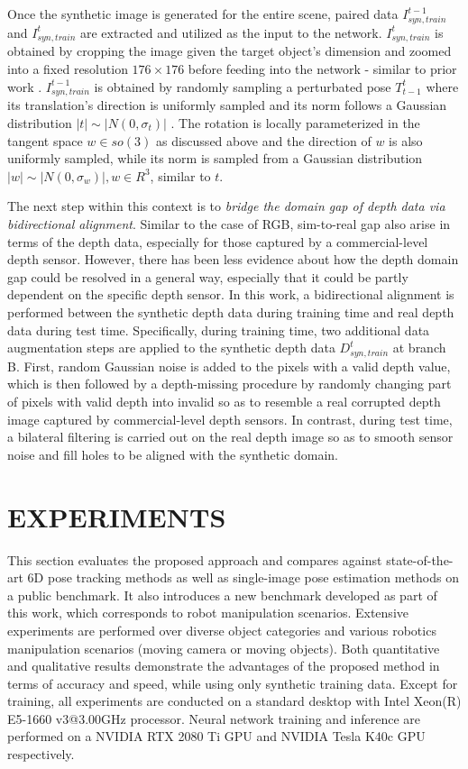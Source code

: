 \documentclass[letterpaper, 10 pt, conference]{ieeeconf}
\begin{document}
Once the synthetic image is generated for the entire scene, paired data $I^{t-1}_{syn,train}$ and $I^{t}_{syn,train}$ are extracted and utilized as the input to the network. $I^{t}_{syn,train}$ is obtained by cropping the image given the target object's dimension and zoomed into a fixed resolution $176 \times 176$ before feeding into the network - similar to prior work \cite{li2018deepim}. $I^{t-1}_{syn,train}$ is obtained by randomly sampling a perturbated pose $T_{t-1}^{t}$ where its translation's direction is uniformly sampled and its norm follows a Gaussian distribution $|t| \sim |N(0,\sigma_t)|$ . The rotation is locally parameterized in the tangent space $w \in so(3)$ as discussed above and the direction of $w$ is also uniformly sampled, while its norm is sampled from a Gaussian distribution $|w| \sim |N(0,\sigma_w)|, w \in R^3$, similar to $t$.

The next step within this context is to {\it bridge the domain gap of depth data via bidirectional alignment}. Similar to the case of RGB, sim-to-real gap also arise in terms of the depth data, especially for those captured by a commercial-level depth sensor. However, there has been less evidence about how the depth domain gap could be resolved in a general way, especially that it could be partly dependent on the specific depth sensor. In this work, a bidirectional alignment is performed between the synthetic depth data during training time and real depth data during test time. Specifically, during training time, two additional data augmentation steps are applied to the synthetic depth data $D^{t}_{syn,train}$ at branch B. First, random Gaussian noise is added to the pixels with a valid depth value, which is then followed by a depth-missing procedure by randomly changing part of pixels with valid depth into invalid so as to resemble a real corrupted depth image captured by commercial-level depth sensors. In contrast, during test time, a bilateral filtering is carried out on the real depth image so as to smooth sensor noise and fill holes to be aligned with the synthetic domain. 

\section{EXPERIMENTS}
This  section  evaluates  the  proposed  approach  and  compares  against  state-of-the-art 6D pose tracking methods as well as single-image pose estimation methods on a public benchmark. It also introduces a new benchmark developed as part of this work, which corresponds to robot manipulation scenarios. Extensive experiments are performed over diverse object categories and various robotics manipulation scenarios (moving camera or moving objects). Both quantitative and qualitative results demonstrate the advantages of the proposed method in terms of accuracy and speed, while using only synthetic training data. Except for training, all  experiments  are  conducted  on  a  standard  desktop with  Intel  Xeon(R) E5-1660 v3@3.00GHz  processor. Neural network training and inference are performed on a  NVIDIA RTX 2080 Ti GPU and  NVIDIA Tesla K40c GPU respectively.
\end{document}
